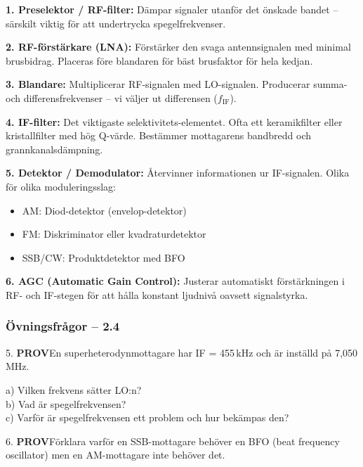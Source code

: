 \documentclass[a4paper,11pt,twoside]{book}
\newcommand{\emoji}[1]{{\emojifont #1}}
\newcommand{\qprov}{\colorbox{redpale}{\textcolor{reddark}{\headingfont\bfseries\tiny PROV}}}
\begin{document}
\begin{bluebox}[title={\emoji{🔑} Mottagarblocken i detalj}]
\textbf{1. Preselektor / RF-filter:}
Dämpar signaler utanför det önskade bandet -- särskilt viktig
för att undertrycka spegelfrekvenser.

\medskip
\textbf{2. RF-förstärkare (LNA):}
Förstärker den svaga antennsignalen med minimal brusbidrag.
Placeras före blandaren för bäst brusfaktor för hela kedjan.

\medskip
\textbf{3. Blandare:}
Multiplicerar RF-signalen med LO-signalen. Producerar
summa- och differensfrekvenser -- vi väljer ut differensen ($f_{\text{IF}}$).

\medskip
\textbf{4. IF-filter:}
Det viktigaste selektivitets-elementet. Ofta ett keramikfilter
eller kristallfilter med hög Q-värde. Bestämmer mottagarens
bandbredd och grannkanalsdämpning.

\medskip
\textbf{5. Detektor / Demodulator:}
Återvinner informationen ur IF-signalen. Olika för olika
moduleringsslag:
\begin{itemize}
  \item AM: Diod-detektor (envelop-detektor)
  \item FM: Diskriminator eller kvadraturdetektor
  \item SSB/CW: Produktdetektor med BFO
\end{itemize}

\medskip
\textbf{6. AGC (Automatic Gain Control):}
Justerar automatiskt förstärkningen i RF- och IF-stegen för
att hålla konstant ljudnivå oavsett signalstyrka.
\end{bluebox}

\subsubsection*{Övningsfrågor -- 2.4}

\begin{qblock}{5.}
\qprov\quad En superheterodynmottagare har IF = 455\,kHz och
är inställd på 7,050\,MHz.

a) Vilken frekvens sätter LO:n?\\
b) Vad är spegelfrekvensen?\\
c) Varför är spegelfrekvensen ett problem och hur bekämpas den?
\end{qblock}

\begin{qblock}{6.}
\qprov\quad Förklara varför en SSB-mottagare behöver en BFO
(beat frequency oscillator) men en AM-mottagare inte behöver det.
\end{qblock}
\end{document}
